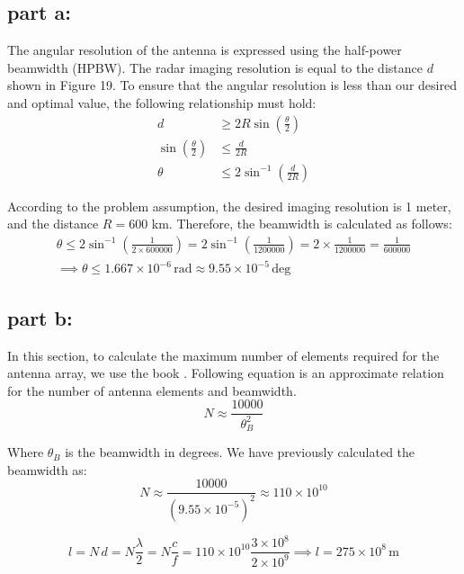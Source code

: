 \documentclass[12pt,onecolumn,a4paper]{article}
\begin{document}
	
	\FloatBarrier
	\subsection{part a:}
	
	The angular resolution of the antenna is expressed using the half-power beamwidth (HPBW). The radar imaging resolution is equal to the distance $d$ shown in Figure 19. To ensure that the angular resolution is less than our desired and optimal value, the following relationship must hold:
	\begin{align}
		d &\geq 2R \sin\left(\frac{\theta}{2}\right) \\ \sin\left(\frac{\theta}{2}\right) &\leq \frac{d}{2R} \\
		 \theta &\leq 2 \sin^{-1}\left(\frac{d}{2R}\right)
	\end{align}
	
	According to the problem assumption, the desired imaging resolution is 1 meter, and the distance $R = 600$ km. Therefore, the beamwidth is calculated as follows:
	\begin{gather}
		\theta \leq 2 \sin^{-1} \left( \frac{1}{2 \times 600000} \right) = 2 \sin^{-1} \left( \frac{1}{1200000} \right) = 2 \times \frac{1}{1200000} = \frac{1}{600000} \\
		\implies \theta \leq 1.667 \times 10^{-6} \, \text{rad} \approx 9.55 \times 10^{-5} \, \text{deg}
	\end{gather}
	
	\FloatBarrier
	\subsection{part b:}
	
	In this section, to calculate the maximum number of elements required for the antenna array, we use the book \cite{book:RadarHandbook}. Following equation is an approximate relation for the number of antenna elements and beamwidth.
	\begin{equation}
		N \approx \frac{10000}{\theta_B^2}
	\end{equation}
	
	Where $\theta_B$ is the beamwidth in degrees. We have previously calculated the beamwidth as:
	\begin{equation}
		N \approx \frac{10000}{(9.55 \times 10^{-5})^2} \approx 110 \times 10^{10}
	\end{equation}
	
	
	\begin{equation}
		l = N \, d = N \frac{\lambda}{2} = N \frac{c}{f} = 110 \times 10^{10} \frac{3 \times 10^8}{2 \times 10^9} \implies l = 275 \times 10^8 \, \text{m}
	\end{equation}
	
\end{document}

